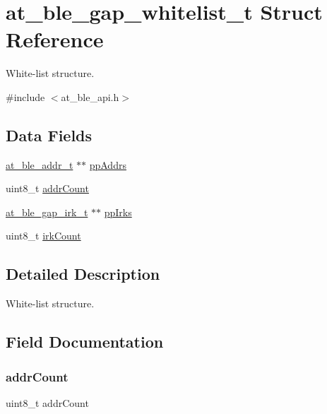 \hypertarget{structat__ble__gap__whitelist__t}{}\section{at\+\_\+ble\+\_\+gap\+\_\+whitelist\+\_\+t Struct Reference}
\label{structat__ble__gap__whitelist__t}


White-\/list structure.  




{\ttfamily \#include $<$at\+\_\+ble\+\_\+api.\+h$>$}

\subsection*{Data Fields}
\begin{DoxyCompactItemize}
\item 
\mbox{\hyperlink{structat__ble__addr__t}{at\+\_\+ble\+\_\+addr\+\_\+t}} $\ast$$\ast$ \mbox{\hyperlink{structat__ble__gap__whitelist__t_ad6b42a15127a7440c62e539669240593}{pp\+Addrs}}
\item 
uint8\+\_\+t \mbox{\hyperlink{structat__ble__gap__whitelist__t_ae80e1585c16424d422460ae9fee89595}{addr\+Count}}
\item 
\mbox{\hyperlink{structat__ble__gap__irk__t}{at\+\_\+ble\+\_\+gap\+\_\+irk\+\_\+t}} $\ast$$\ast$ \mbox{\hyperlink{structat__ble__gap__whitelist__t_aaf277b9883c15b2e68b9592697389f31}{pp\+Irks}}
\item 
uint8\+\_\+t \mbox{\hyperlink{structat__ble__gap__whitelist__t_a2264bf0e31aac88b0856e018c464968a}{irk\+Count}}
\end{DoxyCompactItemize}


\subsection{Detailed Description}
White-\/list structure. 

\subsection{Field Documentation}
\mbox{\label{structat__ble__gap__whitelist__t_ae80e1585c16424d422460ae9fee89595}} 
\subsubsection{\texorpdfstring{addrCount}{addrCount}}
{\footnotesize\ttfamily uint8\+\_\+t addr\+Count}


